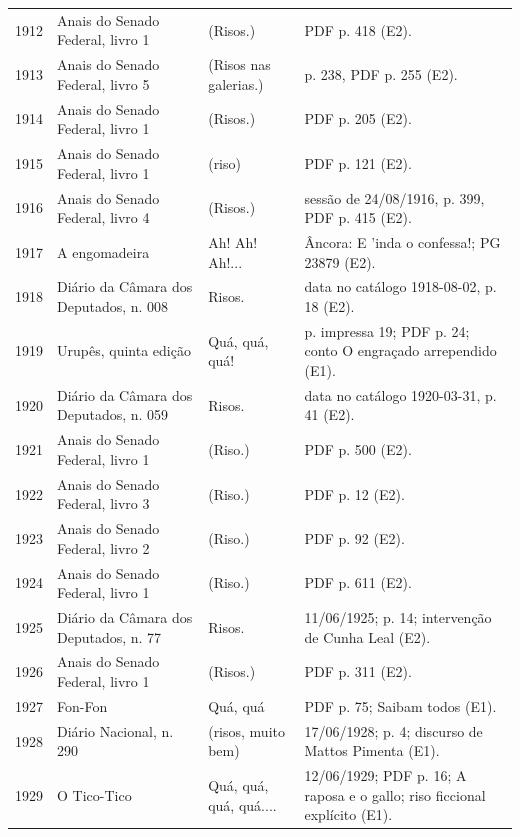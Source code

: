 \begin{longtable}{p{}p{}p{}p{}}
1912 & Anais do Senado Federal, livro 1 \cite{anual1912} & (Risos.) & PDF p. 418 (E2). \\
1913 & Anais do Senado Federal, livro 5 \cite{anual1913} & (Risos nas galerias.) & p. 238, PDF p. 255 (E2). \\
1914 & Anais do Senado Federal, livro 1 \cite{anual1914} & (Risos.) & PDF p. 205 (E2). \\
1915 & Anais do Senado Federal, livro 1 \cite{anual1915} & (riso) & PDF p. 121 (E2). \\
1916 & Anais do Senado Federal, livro 4 \cite{anual1916} & (Risos.) & sessão de 24/08/1916, p. 399, PDF p. 415 (E2). \\
1917 & A engomadeira \cite{almada1917} & Ah! Ah! Ah!... & Âncora: E 'inda o confessa!; PG 23879 (E2). \\
1918 & Diário da Câmara dos Deputados, n. 008 \cite{anual1918} & Risos. & data no catálogo 1918-08-02, p. 18 (E2). \\
1919 & Urupês, quinta edição \cite{lobato1919} & Quá, quá, quá! & p. impressa 19; PDF p. 24; conto O engraçado arrependido (E1). \\
1920 & Diário da Câmara dos Deputados, n. 059 \cite{anual1920} & Risos. & data no catálogo 1920-03-31, p. 41 (E2). \\
1921 & Anais do Senado Federal, livro 1 \cite{anual1921} & (Riso.) & PDF p. 500 (E2). \\
1922 & Anais do Senado Federal, livro 3 \cite{anual1922} & (Riso.) & PDF p. 12 (E2). \\
1923 & Anais do Senado Federal, livro 2 \cite{anual1923} & (Riso.) & PDF p. 92 (E2). \\
1924 & Anais do Senado Federal, livro 1 \cite{anual1924} & (Riso.) & PDF p. 611 (E2). \\
1925 & Diário da Câmara dos Deputados, n. 77 \cite{portugal1925} & Risos. & 11/06/1925; p. 14; intervenção de Cunha Leal (E2). \\
1926 & Anais do Senado Federal, livro 1 \cite{anual1926} & (Risos.) & PDF p. 311 (E2). \\
1927 & Fon-Fon \cite{anual1927} & Quá, quá & PDF p. 75; Saibam todos (E1). \\
1928 & Diário Nacional, n. 290 \cite{diarionacional1928} & (risos, muito bem) & 17/06/1928; p. 4; discurso de Mattos Pimenta (E1). \\
1929 & O Tico-Tico \cite{anual1929} & Quá, quá, quá, quá.... & 12/06/1929; PDF p. 16; A raposa e o gallo; riso ficcional explícito (E1). \\

\end{longtable}
